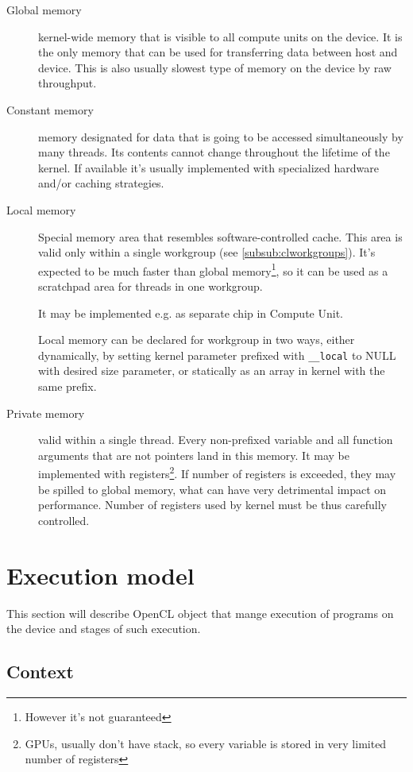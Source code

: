 \begin{description}
  \item[Global memory]
    kernel-wide memory that is visible to all compute units on the device.
    It is the only memory that can be used for transferring data between host and
    device. This is also usually slowest type of memory on the device by raw
    throughput.
  \item[Constant memory]
    memory designated for data that is going to be accessed simultaneously by
    many threads. Its contents cannot change throughout the lifetime of the
    kernel. If available it's usually implemented with specialized hardware
    and/or caching strategies.
  \item[Local memory]
    Special memory area that resembles software-controlled cache. This area is
    valid only within a single workgroup (see \autoref{subsub:clworkgroups}). It's
    expected to be much faster than global memory\footnote{However it's not guaranteed},
    so it can be used as a scratchpad area for threads in one workgroup.

    It may be implemented e.g. as separate chip in Compute Unit.

    Local memory can be declared for workgroup in two ways, either dynamically,
    by setting kernel parameter prefixed with \texttt{\_\_local} to NULL with
    desired size parameter, or statically as an array in kernel with the same
    prefix.

  \item[Private memory]
    valid within a single thread. Every non-prefixed variable and all function
    arguments that are not pointers land in this memory. It may be implemented
    with registers\footnote{GPUs, usually don't have stack, so every variable
    is stored in very limited number of registers}. If number of registers is
    exceeded, they may be spilled to global memory, what can have very
    detrimental impact on performance. Number of registers used by kernel must
    be thus carefully controlled.
\end{description}

\section{Execution model}
\label{sec:clexecmodel}

This section will describe OpenCL object that mange execution of programs on the
device and stages of such execution.

\subsection{Context}

